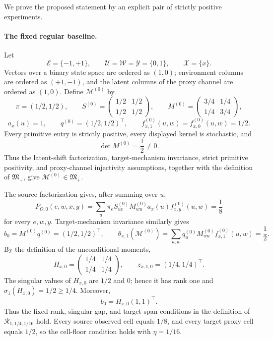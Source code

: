 We prove the proposed statement by an explicit pair of strictly positive experiments.

\paragraph{The fixed regular baseline.}
Let
\[
\mathcal E=\{-1,+1\},\qquad
\mathcal U=\mathcal W=\mathcal Y=\{0,1\},\qquad
\mathcal X=\{x\}.
\]
Vectors over a binary state space are ordered as \((1,0)\); environment columns are ordered as \((+1,-1)\), and the latent columns of the proxy channel are ordered as \((1,0)\). Define \(\mathcal M^{(0)}\) by
\[
\pi=(1/2,1/2),\qquad
S^{(0)}=
\begin{pmatrix}1/2&1/2\\1/2&1/2\end{pmatrix},\qquad
M^{(0)}=
\begin{pmatrix}3/4&1/4\\1/4&3/4\end{pmatrix},
\]
\[
a_x(u)=1,\qquad q^{(0)}=(1/2,1/2)^{\top},\qquad
f^{(0)}_{x,1}(u,w)=f^{(0)}_{x,0}(u,w)=1/2.
\]
Every primitive entry is strictly positive, every displayed kernel is stochastic, and
\[
\det M^{(0)}=\frac12\ne0.
\]
Thus the latent-shift factorization, target-mechanism invariance, strict primitive positivity, and proxy-channel injectivity assumptions, together with the definition of \(\mathfrak M_{+}\), give \(\mathcal M^{(0)}\in\mathfrak M_{+}\).

The source factorization gives, after summing over \(u\),
\[
P_{O,0}(e,w,x,y)=\sum_{u}\pi_eS^{(0)}_{ue}M^{(0)}_{wu}a_x(u)f^{(0)}_{x,y}(u,w)=\frac18
\]
for every \(e,w,y\). Target-mechanism invariance similarly gives
\[
b_0=M^{(0)}q^{(0)}=(1/2,1/2)^{\top},
\qquad
\theta_{x,1}(\mathcal M^{(0)})
=\sum_{u,w}q^{(0)}_uM^{(0)}_{wu}f^{(0)}_{x,1}(u,w)=\frac12.
\]
By the definition of the unconditional moments,
\[
H_{x,0}=
\begin{pmatrix}1/4&1/4\\1/4&1/4\end{pmatrix},
\qquad
z_{x,1,0}=(1/4,1/4)^{\top}.
\]
The singular values of \(H_{x,0}\) are \(1/2\) and \(0\); hence it has rank one and \(\sigma_1(H_{x,0})=1/2\ge1/4\). Moreover,
\[
b_0=H_{x,0}(1,1)^{\top}.
\]
Thus the fixed-rank, singular-gap, and target-span conditions in the definition of \(\mathcal R_{1,1/4,1/16}\) hold. Every source observed cell equals \(1/8\), and every target proxy cell equals \(1/2\), so the cell-floor condition holds with \(\eta=1/16\).

